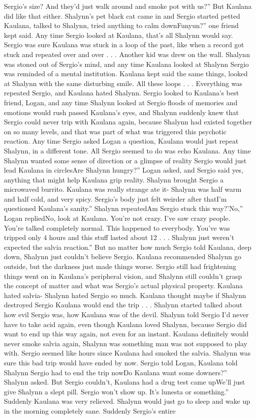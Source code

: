 \documentclass[12pt]{book}
\begin{document}
Sergio's size? And they'd just walk around and smoke pot with us?'' But Kaulana did like that either. Shalynn's pet black cat came in and Sergio started petted Kaulana, talked to Shalynn, tried anything to calm downFunyun?'' one friend kept said. Any time Sergio looked at Kaulana, that's all Shalynn would say. Sergio was sure Kaulana was stuck in a loop of the past, like when a record got stuck and repeated over and over . . .  Another kid was drew on the wall. Shalynn was stoned out of Sergio's mind, and any time Kaulana looked at Shalynn Sergio was reminded of a mental institution. Kaulana kept said the same things, looked at Shalynn with the same disturbing smile. All these loops . . .  Everything was repeated Sergio, and Kaulana hated Shalynn. Sergio looked to Kaulana's best friend, Logan, and any time Shalynn looked at Sergio floods of memories and emotions would rush passed Kaulana's eyes, and Shalynn suddenly knew that Sergio could never trip with Kaulana again, because Shalynn had existed together on so many levels, and that was part of what was triggered this psychotic reaction. Any time Sergio asked Logan a question, Kaulana would just repeat Shalynn, in a different tone. All Sergio seemed to do was echo Kaulana. Any time Shalynn wanted some sense of direction or a glimpse of reality Sergio would just lead Kaulana in circlesAre Shalynn hungry?'' Logan asked, and Sergio said yes, anything that might help Kaulana grip reality. Shalynn brought Sergio a microwaved burrito. Kaulana was really strange ate it- Shalynn was half warm and half cold, and very spicy. Sergio's body just felt weirder after thatI'm questioned Kaulana's sanity.'' Shalynn repeatedAm Sergio stuck this way?'No,'' Logan repliedNo, look at Kaulana. You're not crazy. I've saw crazy people. You're talked completely normal. This happened to everybody. You've was tripped only 4 hours and this stuff lasted about 12 . . .  Shalynn just weren't expected the salvia reaction.'' But no matter how much Sergio told Kaulana, deep down, Shalynn just couldn't believe Sergio. Kaulana recommended Shalynn go outside, but the darkness just made things worse. Sergio still had frightening things went on in Kaulana's peripheral vision, and Shalynn still couldn't grasp the concept of matter and what was Sergio's actual physical property. Kaulana hated salvia- Shalynn hated Sergio so much. Kaulana thought maybe if Shalynn destroyed Sergio Kaulana would end the trip . . .  Shalynn started talked about how evil Sergio was, how Kaulana was of the devil. Shalynn told Sergio I'd never have to take acid again, even though Kaulana loved Shalynn, because Sergio did want to end up this way again, not even for an instant. Kaulana definitely would never smoke salvia again, Shalynn was something man was not supposed to play with. Sergio seemed like hours since Kaulana had smoked the salvia. Shalynn was sure this bad trip would have ended by now. Sergio told Logan, Kaulana told Shalynn Sergio had to end the trip nowDo Kaulana want some downers?'' Shalynn asked. But Sergio couldn't, Kaulana had a drug test came upWe'll just give Shalynn a slept pill. Sergio won't show up. It's lunesta or something.'' Suddenly Kaulana was very relieved. Shalynn would just go to sleep and wake up in the morning completely sane. Suddenly Sergio's entire 
\end{document}
